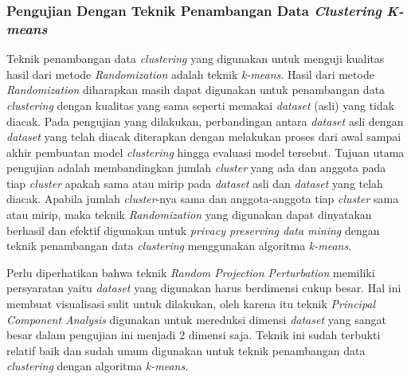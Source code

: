 \subsubsection{Pengujian Dengan Teknik Penambangan Data \textit{Clustering} \textit{K-means}}
\label{subsubsec:analisis-kmeans}

Teknik penambangan data \textit{clustering} yang digunakan untuk menguji kualitas hasil dari metode \textit{Randomization} adalah teknik \textit{k-means}. Hasil dari metode \textit{Randomization} diharapkan masih dapat digunakan untuk penambangan data \textit{clustering} dengan kualitas yang sama seperti memakai \textit{dataset} (asli) yang tidak diacak. Pada pengujian yang dilakukan, perbandingan antara \textit{dataset} asli dengan \textit{dataset} yang telah diacak diterapkan dengan melakukan proses dari awal sampai akhir pembuatan model \textit{clustering} hingga evaluasi model tersebut. Tujuan utama pengujian adalah membandingkan jumlah \textit{cluster} yang ada dan anggota pada tiap \textit{cluster} apakah sama atau mirip pada \textit{dataset} asli dan \textit{dataset} yang telah diacak. Apabila jumlah \textit{cluster}-nya sama dan anggota-anggota tiap \textit{cluster} sama atau mirip, maka teknik \textit{Randomization} yang digunakan dapat dinyatakan berhasil dan efektif digunakan untuk \textit{privacy preserving data mining} dengan teknik penambangan data \textit{clustering} menggunakan algoritma \textit{k-means}.

Perlu diperhatikan bahwa teknik \textit{Random Projection Perturbation} memiliki persyaratan yaitu \textit{dataset} yang digunakan harus berdimensi cukup besar. Hal ini membuat visualisasi sulit untuk dilakukan, oleh karena itu teknik \textit{Principal Component Analysis} digunakan untuk mereduksi dimensi \textit{dataset} yang sangat besar dalam pengujian ini menjadi 2 dimensi saja. Teknik ini sudah terbukti relatif baik dan sudah umum digunakan untuk teknik penambangan data \textit{clustering} dengan algoritma \textit{k-means}.

